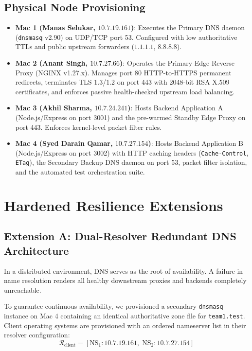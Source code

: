 \documentclass[conference]{IEEEtran}
\begin{document}
\subsection{Physical Node Provisioning}
\begin{itemize}
    \item \textbf{Mac 1 (Manas Selukar, $10.7.19.161$)}: Executes the Primary DNS daemon (\texttt{dnsmasq} v2.90) on UDP/TCP port 53. Configured with low authoritative TTLs and public upstream forwarders ($1.1.1.1$, $8.8.8.8$).
    \item \textbf{Mac 2 (Anant Singh, $10.7.27.66$)}: Operates the Primary Edge Reverse Proxy (NGINX v1.27.x). Manages port 80 HTTP-to-HTTPS permanent redirects, terminates TLS 1.3/1.2 on port 443 with 2048-bit RSA X.509 certificates, and enforces passive health-checked upstream load balancing.
    \item \textbf{Mac 3 (Akhil Sharma, $10.7.24.241$)}: Hosts Backend Application A (Node.js/Express on port 3001) and the pre-warmed Standby Edge Proxy on port 443. Enforces kernel-level packet filter rules.
    \item \textbf{Mac 4 (Syed Darain Qamar, $10.7.27.154$)}: Hosts Backend Application B (Node.js/Express on port 3002) with HTTP caching headers (\texttt{Cache-Control}, \texttt{ETag}), the Secondary Backup DNS daemon on port 53, packet filter isolation, and the automated test orchestration suite.
\end{itemize}

\section{Hardened Resilience Extensions}

\subsection{Extension A: Dual-Resolver Redundant DNS Architecture}
In a distributed environment, DNS serves as the root of availability. A failure in name resolution renders all healthy downstream proxies and backends completely unreachable.

To guarantee continuous availability, we provisioned a secondary \texttt{dnsmasq} instance on Mac 4 containing an identical authoritative zone file for \texttt{team1.test}. Client operating systems are provisioned with an ordered nameserver list in their resolver configuration:
\begin{equation}
\mathcal{R}_{\text{client}} = \left[\text{NS}_1: 10.7.19.161, \; \text{NS}_2: 10.7.27.154\right]
\end{equation}
\end{document}
